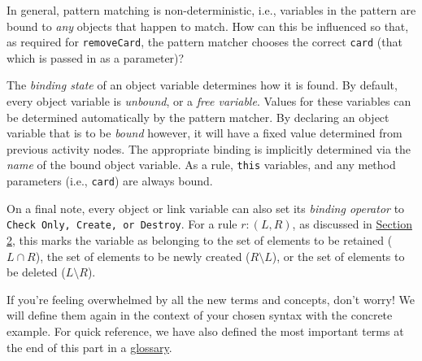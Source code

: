 In general, pattern matching is non-deterministic, i.e., variables in the pattern are bound to \emph{any} objects that happen to match. How can this
be influenced so that, as required for \texttt{removeCard}, the pattern matcher chooses the correct \texttt{card} (that which is passed in as a parameter)?

The \emph{binding state} of an object variable determines how it is found. By default, every object variable is \emph{unbound}, or a 
\emph{free variable}. Values for these variables can be determined automatically by the pattern matcher. By declaring an
object variable that is to be \emph{bound} however, it will have a fixed value determined from previous activity nodes. The appropriate binding is
implicitly determined via the \emph{name} of the bound object variable. As a rule, \texttt{this} variables, and any method parameters (i.e., \texttt{card}) are
always bound.

On a final note, every object or link variable can also set its \emph{binding operator} to \texttt{Check Only, Create, or Destroy}. For a rule $r: (L,
R)$, as discussed in \hyperlink{explanation}{Section 2}, this marks the variable as belonging to the set of elements to be retained ($L\cap R$), the set of
elements to be newly created ($R\setminus L$), or the set of elements to be deleted ($L\setminus R$).

If you're feeling overwhelmed by all the new terms and concepts, don't worry! We will define them again in the context of your chosen syntax with the
concrete example. For quick reference, we have also defined the most important terms at the end of this part in a \hyperlink{glossary}{glossary}. 






